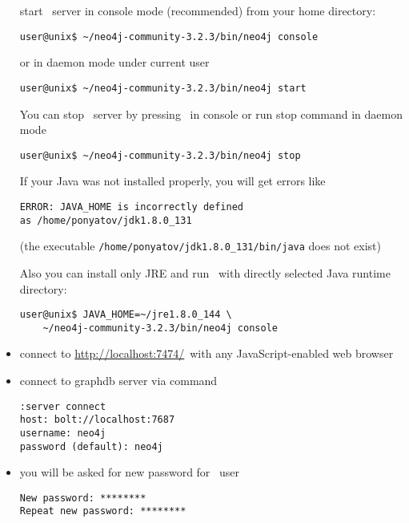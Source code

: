 \begin{itemize}[leftmargin=*]
start \neo\ server in console mode (recommended) from your home directory:
\begin{verbatim}
user@unix$ ~/neo4j-community-3.2.3/bin/neo4j console
\end{verbatim}
or in daemon mode under current user
\begin{verbatim}
user@unix$ ~/neo4j-community-3.2.3/bin/neo4j start
\end{verbatim}
You can stop \neo\ server by pressing \ in console or run stop
command in daemon mode
\begin{verbatim}
user@unix$ ~/neo4j-community-3.2.3/bin/neo4j stop
\end{verbatim}
If your Java was not installed properly, you will get errors like
\begin{verbatim}
ERROR: JAVA_HOME is incorrectly defined
as /home/ponyatov/jdk1.8.0_131
\end{verbatim}
(the executable \verb|/home/ponyatov/jdk1.8.0_131/bin/java| does not exist)

Also you can install only JRE and run \neo\ with directly selected Java runtime
directory:
\begin{verbatim}
user@unix$ JAVA_HOME=~/jre1.8.0_144 \
    ~/neo4j-community-3.2.3/bin/neo4j console
\end{verbatim}

\item connect to \url{http://localhost:7474/}\ with any JavaScript-enabled web
browser

\item connect to graphdb server via command
\begin{verbatim}
:server connect
host: bolt://localhost:7687
username: neo4j
password (default): neo4j
\end{verbatim}

\item you will be asked for new password for \neo\ user
\begin{verbatim}
New password: ********
Repeat new password: ********
\end{verbatim}
  
\end{itemize}